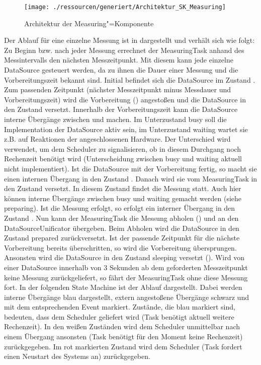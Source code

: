 \begin{figure}[!htb]
    \centering
    \texttt{[image: ./ressourcen/generiert/Architektur\_SK\_Measuring]}
    \caption{Architektur der Measuring"=Komponente}
    \label{fig:Architektur_SK_Measuring}
\end{figure}

Der Ablauf für eine einzelne Messung ist in  dargestellt und verhält sich wie folgt: Zu Beginn bzw. nach jeder Messung errechnet der MeasuringTask anhand des Messintervalls den nächsten Messzeitpunkt.
Mit diesem kann jede einzelne DataSource gesteuert werden, da zu ihnen die Dauer einer Messung und die Vorbereitungszeit bekannt sind.
Initial befindet sich die DataSource im Zustand .
Zum passenden Zeitpunkt (nächster Messzeitpunkt minus Messdauer und Vorbereitungszeit) wird die Vorbereitung () angestoßen und die DataSource in den Zustand  versetzt.
Innerhalb der Vorbereitungszeit kann die DataSource interne Übergänge zwischen  und  machen.
Im Unterzustand busy soll die Implementation der DataSource aktiv sein, im Unterzustand waiting wartet sie z.B. auf Reaktionen der angeschlossenen Hardware.
Der Unterschied wird verwendet, um dem Scheduler zu signalisieren, ob in diesem Durchgang noch Rechenzeit benötigt wird (Unterscheidung zwischen busy und waiting aktuell nicht implementiert).
Ist die DataSource mit der Vorbereitung fertig, so macht sie einen internen Übergang in den Zustand .
Danach wird sie vom MeasuringTask in den Zustand  versetzt.
In diesem Zustand findet die Messung statt.
Auch hier können interne Übergänge zwischen busy und waiting gemacht werden (siehe preparing).
Ist die Messung erfolgt, so erfolgt ein interner Übergang in den Zustand .
Nun kann der MeasuringTask die Messung abholen () und an den DataSourceUnificator übergeben.
Beim Abholen wird die DataSource in den Zustand prepared zurückversetzt.
Ist der passende Zeitpunkt für die nächste Vorbereitung bereits überschritten, so wird die Vorbereitung übersprungen.
Ansonsten wird die DataSource in den Zustand sleeping versetzt ().
Wird von einer DataSource innerhalb von 3 Sekunden ab dem geforderten Messzeitpunkt keine Messung zurückgeliefert, so fährt der MeasuringTask ohne diese Messung fort.
In der folgenden State Machine ist der Ablauf dargestellt.
Dabei werden interne Übergänge blau dargestellt, extern angestoßene Übergänge schwarz und mit dem entsprechenden Event markiert.
Zustände, die blau markiert sind, bedeuten, dass dem Scheduler  geliefert wird (Task benötigt aktuell weitere Rechenzeit).
In den weißen Zuständen wird dem Scheduler unmittelbar nach einem Übergang  ansonsten  (Task benötigt für den Moment keine Rechenzeit) zurückgegeben.
Im rot markierten Zustand wird dem Scheduler  (Task fordert einen Neustart des Systems an) zurückgegeben.

